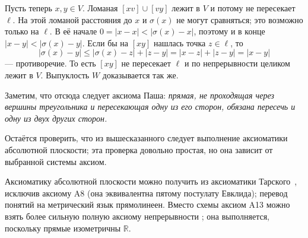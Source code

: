 \documentclass[a4paper,10pt]{article}
\begin{document}
Пусть теперь $x,y\in V$.
Ломаная $[xv]\cup[vy]$ лежит в $V$ и потому не пересекает $\ell$.
На этой ломаной расстояния до $x$ и $\sigma(x)$ не могут сравняться; это возможно только на $\ell$.
В её начале $0=|x-x|<|\sigma(x)-x|$, поэтому и в конце $|x-y|<|\sigma(x)-y|$.
Если бы на $[xy]$ нашлась точка $z\in\ell$, то
\[|\sigma(x)-y|\le |\sigma(x)-z|+|z-y|=|x-z|+|z-y|=|x-y|\]
--- противоречие.
То есть $[xy]$ не пересекает $\ell$ и по непрерывности целиком лежит в $V$.
Выпуклость $W$ доказывается так же.

Заметим, что отсюда следует аксиома Паша: \textit{прямая, не проходящая через вершины треугольника и пересекающая одну из его сторон, обязана пересечь и одну из двух других сторон.}

Остаётся проверить, что из вышесказанного следует выполнение аксиоматики абсолютной плоскости;
эта проверка довольно простая, но она зависит от выбранной системы аксиом.

Аксиоматику абсолютной плоскости можно получить из аксиоматики Тарского~\cite{tarski}, исключив аксиому A8 (она эквивалентна пятому постулату Евклида);
перевод понятий на метрический язык прямолинеен.
Вместо схемы аксиом A13 можно взять более сильную полную аксиому непрерывности \cite[с. 18]{tarski}; она выполняется, поскольку прямые изометричны $\mathbb R$.


{\sloppy
\def\emph{\textit}
\printbibliography[heading=bibintoc]\fussy}
\end{document}
